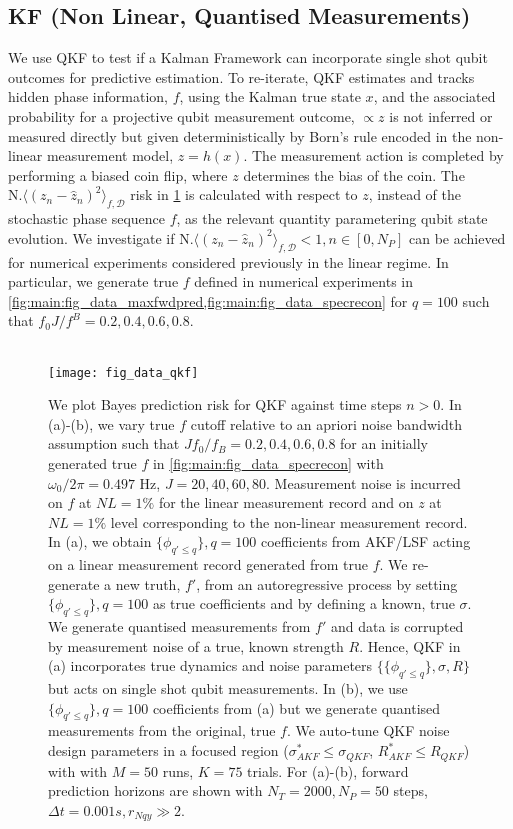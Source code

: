 \subsection{KF (Non Linear, Quantised Measurements)}
We use QKF to test if a Kalman Framework can incorporate single shot qubit outcomes for predictive estimation. To re-iterate, QKF estimates and tracks hidden phase information, $f$, using the Kalman true state $x$, and the associated probability for a projective qubit measurement outcome, $\propto z$ is not inferred or measured directly but given deterministically by Born's rule encoded in the non-linear measurement model, $z = h(x)$. The measurement action is completed by performing a biased coin flip, where $z$ determines the bias of the coin.  The $\text{N.} \langle (z_n - \hat{z}_n)^2 \rangle_{f, \mathcal{D}} $ risk in  \cref{fig:main:fig_data_qkf2} is calculated with respect to  $z$, instead of the stochastic phase sequence $f$, as the relevant quantity parametering qubit state evolution. We investigate if $\text{N.} \langle (z_n - \hat{z}_n)^2 \rangle_{f, \mathcal{D}} < 1, n\in [0, N_P] $ can be achieved for numerical experiments considered previously in the linear regime. In particular, we generate true $f$ defined in numerical experiments in \cref{fig:main:fig_data_maxfwdpred,fig:main:fig_data_specrecon} for $q=100$ such that $f_0 J / f^B = 0.2, 0.4, 0.6, 0.8$.  
\\
\\
\begin{figure}[h!]
    \texttt{[image: fig\_data\_qkf]}
    \caption{\label{fig:main:fig_data_qkf2} We plot Bayes prediction risk for QKF against time steps $n>0$. In (a)-(b), we vary true $f$ cutoff relative to an apriori noise bandwidth assumption such that $J f_0 / f_B = 0.2, 0.4, 0.6, 0.8$ for an initially generated true $f$ in \cref{fig:main:fig_data_specrecon} with $\omega_0/ 2\pi = 0.497 $ Hz, $J = 20, 40, 60, 80$. Measurement noise is incurred on $f$ at $NL = 1 \%$ for the linear measurement record and on $z$ at $NL = 1\%$ level corresponding to the non-linear measurement record. In (a), we obtain $\{\phi_{q' \leq q}\}, q=100$ coefficients from AKF/LSF acting on a linear measurement record generated from true $f$. We re-generate a new truth, $f'$, from an autoregressive process by setting $\{\phi_{q'\leq q}\}, q=100$ as true coefficients and by defining a known, true $\sigma$. We generate quantised measurements from $f'$ and data is corrupted by measurement noise of a true, known strength $R$. Hence, QKF in (a) incorporates true dynamics and noise parameters $\{\{\phi_{q' \leq q} \}, \sigma, R\}$ but acts on single shot qubit measurements. In (b), we use $\{\phi_{q' \leq q} \}, q=100$ coefficients from (a) but we generate quantised measurements from the original, true $f$. We auto-tune QKF noise design parameters in a focused region ($\sigma_{AKF}^* \leq \sigma_{QKF}$, $R_{AKF}^* \leq R_{QKF}$) with with $M=50$ runs, $K=75$ trials. For (a)-(b), forward prediction horizons are shown with $N_T = 2000, N_P = 50$ steps, $\Delta t = 0.001s, r_{Nqy}\gg 2$.}
\end{figure}
